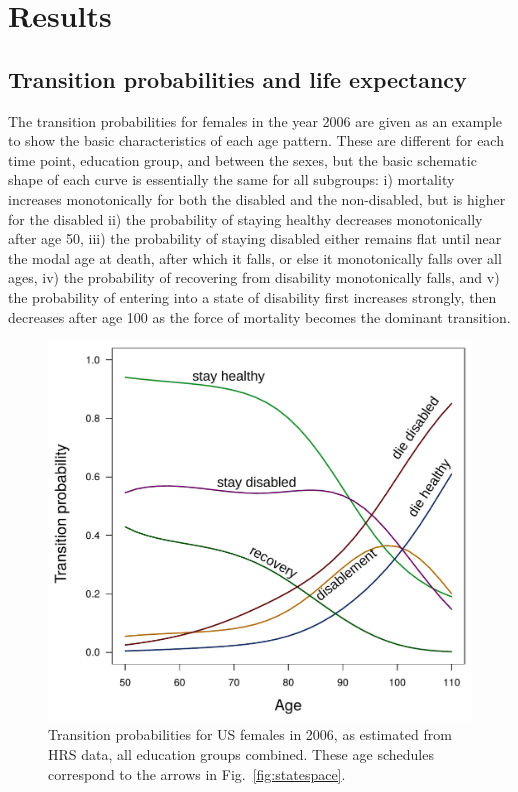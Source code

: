 \section{Results}
\label{sec:results}
\subsection{Transition probabilities and life expectancy}
The transition probabilities for females in the year 2006 are given as an example to show the basic characteristics of each age pattern. These are different for each time point, education group, and between the sexes, but the basic schematic shape of each curve is essentially the same for all subgroups: i) mortality increases monotonically for both the disabled and the non-disabled, but is higher for the disabled ii) the probability of staying healthy decreases monotonically after age 50, iii) the probability of staying disabled either remains flat until near the modal age at death, after which it falls, or else it monotonically falls over all ages, iv) the probability of recovering from disability monotonically falls, and v) the probability of entering into a state of disability first increases strongly, then decreases after age 100 as the force of mortality becomes the dominant transition. 

\begin{figure}[ht!]
\centering
\includegraphics[scale=.7]{Figures/TransitionsInk.pdf}
\caption{Transition probabilities for US females in 2006, as estimated from HRS data, all education groups combined. These age schedules correspond to the arrows in Fig.~\ref{fig:statespace}.}
\end{figure}

